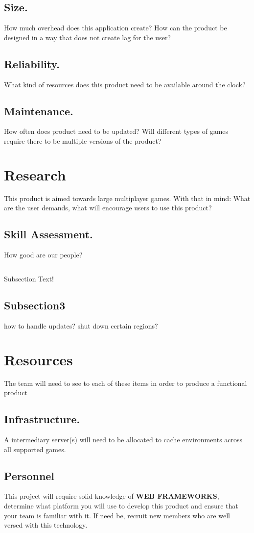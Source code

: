 \documentclass[12pt,journal,compsoc]{IEEEtran}
\begin{document}
    \subsection{Size.}\hphantom{m}How much overhead does this application create? How can the product be designed in a way that does not create lag for the user?
    \subsection{Reliability.}\hphantom{m}What kind of resources does this product need to be available around the clock?
    \subsection{Maintenance.}\hphantom{m}How often does product need to be updated? Will different types of games require there to be multiple versions of the product?
    
\section{Research} This product is aimed towards large multiplayer games. With that in mind: What are the user demands, what will encourage users to use this product?
    \subsection{Skill Assessment.}\hphantom{m}How good are our people?
    \subsection{}Subsection Text!
    \subsection{Subsection3}how to handle updates? shut down certain regions?
\section{Resources} The team will need to see to each of these items in order to produce a functional product
    \subsection{Infrastructure.}\hphantom{m}A intermediary server(s) will need to be allocated to cache environments across all supported games.
    \subsection{Personnel}This project will require solid knowledge of \textbf{WEB FRAMEWORKS}, determine what platform you will use to develop this product and ensure that your team is familiar with it. If need be, recruit new members who are well versed with this technology.
\end{document}
